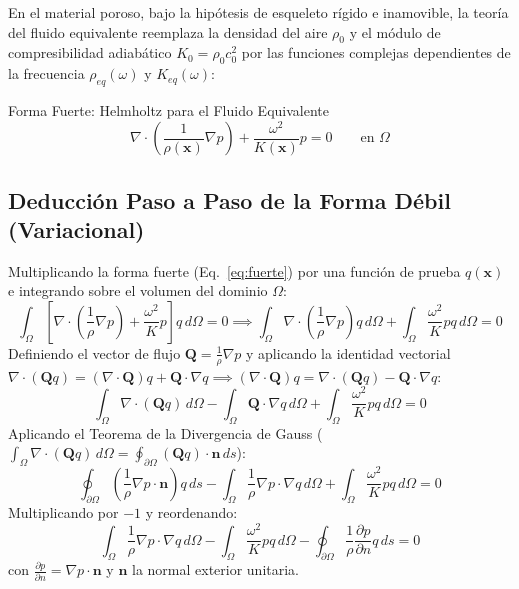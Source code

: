 \documentclass[11pt,a4paper]{article}
\begin{document}
En el material poroso, bajo la hipótesis de esqueleto rígido e inamovible, la teoría del fluido equivalente reemplaza la densidad del aire $\rho_0$ y el módulo de compresibilidad adiabático $K_0=\rho_0 c_0^2$ por las funciones complejas dependientes de la frecuencia $\rho_{eq}(\omega)$ y $K_{eq}(\omega)$:
\begin{infobox}{Forma Fuerte: Helmholtz para el Fluido Equivalente}
\begin{equation}
\nabla \cdot \left( \frac{1}{\rho(\mathbf{x})} \nabla p \right) + \frac{\omega^2}{K(\mathbf{x})} p = 0 \qquad \text{en } \Omega
\label{eq:fuerte}
\end{equation}
\end{infobox}

\subsection{Deducción Paso a Paso de la Forma Débil (Variacional)}
Multiplicando la forma fuerte (Eq.~\ref{eq:fuerte}) por una función de prueba $q(\mathbf{x})$ e integrando sobre el volumen del dominio $\Omega$:
\begin{equation}
\int_\Omega \left[ \nabla \cdot \left( \frac{1}{\rho} \nabla p \right) + \frac{\omega^2}{K} p \right] q \, d\Omega = 0 \implies \int_\Omega \nabla \cdot \left( \frac{1}{\rho} \nabla p \right) q \, d\Omega + \int_\Omega \frac{\omega^2}{K} p q \, d\Omega = 0
\end{equation}
Definiendo el vector de flujo $\mathbf{Q} = \frac{1}{\rho} \nabla p$ y aplicando la identidad vectorial $\nabla \cdot (\mathbf{Q} q) = (\nabla \cdot \mathbf{Q}) q + \mathbf{Q} \cdot \nabla q \implies (\nabla \cdot \mathbf{Q}) q = \nabla \cdot (\mathbf{Q} q) - \mathbf{Q} \cdot \nabla q$:
\begin{equation}
\int_\Omega \nabla \cdot (\mathbf{Q} q) \, d\Omega - \int_\Omega \mathbf{Q} \cdot \nabla q \, d\Omega + \int_\Omega \frac{\omega^2}{K} p q \, d\Omega = 0
\end{equation}
Aplicando el Teorema de la Divergencia de Gauss ($\int_\Omega \nabla \cdot (\mathbf{Q} q) \, d\Omega = \oint_{\partial\Omega} (\mathbf{Q} q) \cdot \mathbf{n} \, ds$):
\begin{equation}
\oint_{\partial\Omega} \left( \frac{1}{\rho} \nabla p \cdot \mathbf{n} \right) q \, ds - \int_\Omega \frac{1}{\rho} \nabla p \cdot \nabla q \, d\Omega + \int_\Omega \frac{\omega^2}{K} p q \, d\Omega = 0
\end{equation}
Multiplicando por $-1$ y reordenando:
\begin{equation}
\int_\Omega \frac{1}{\rho} \nabla p \cdot \nabla q \, d\Omega - \int_\Omega \frac{\omega^2}{K} p q \, d\Omega - \oint_{\partial\Omega} \frac{1}{\rho} \frac{\partial p}{\partial n} q \, ds = 0
\label{eq:debil_general}
\end{equation}
con $\frac{\partial p}{\partial n} = \nabla p \cdot \mathbf{n}$ y $\mathbf{n}$ la normal exterior unitaria.
\end{document}
